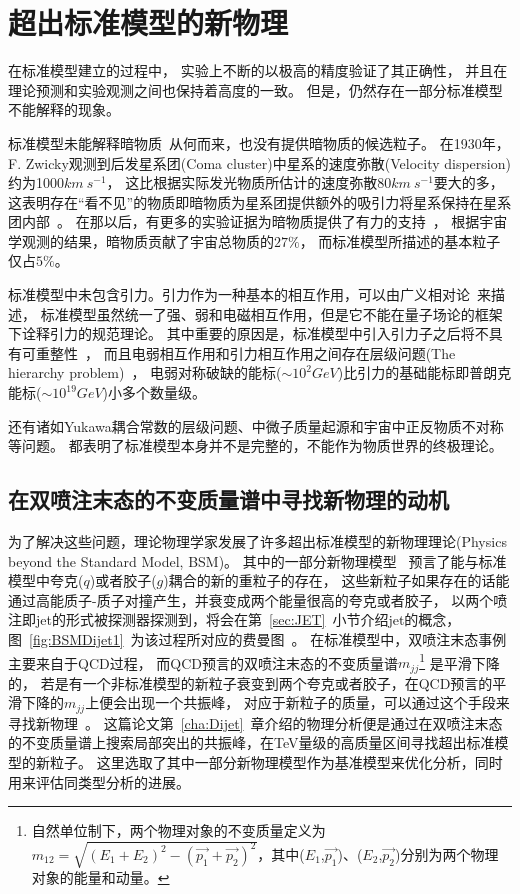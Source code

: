 \section{超出标准模型的新物理}
\label{sec:BSM}

在标准模型建立的过程中，
实验上不断的以极高的精度验证了其正确性，
并且在理论预测和实验观测之间也保持着高度的一致。
但是，仍然存在一部分标准模型不能解释的现象。

标准模型未能解释暗物质~\cite{DARKMATTER1}从何而来，也没有提供暗物质的候选粒子。
在1930年，F. Zwicky观测到后发星系团(Coma cluster)中星系的速度弥散(Velocity dispersion)约为1000$km~s^{-1}$，
这比根据实际发光物质所估计的速度弥散80$km~s^{-1}$要大的多，
这表明存在“看不见”的物质即暗物质为星系团提供额外的吸引力将星系保持在星系团内部~\cite{DARKMATTER2}。
在那以后，有更多的实验证据为暗物质提供了有力的支持~\cite{DARKMATTER1}，
根据宇宙学观测的结果，暗物质贡献了宇宙总物质的$27\%$，
而标准模型所描述的基本粒子仅占$5\%$。

标准模型中未包含引力。引力作为一种基本的相互作用，可以由广义相对论~\cite{GRE}来描述，
标准模型虽然统一了强、弱和电磁相互作用，但是它不能在量子场论的框架下诠释引力的规范理论。
其中重要的原因是，标准模型中引入引力子之后将不具有可重整性~\cite{GRE1}，
而且电弱相互作用和引力相互作用之间存在层级问题(The hierarchy problem)~\cite{HP}，
电弱对称破缺的能标($\sim 10^{2}GeV$)比引力的基础能标即普朗克能标($\sim 10^{19}GeV$)小多个数量级。

还有诸如Yukawa耦合常数的层级问题、中微子质量起源和宇宙中正反物质不对称等问题。
都表明了标准模型本身并不是完整的，不能作为物质世界的终极理论。



\subsection{在双喷注末态的不变质量谱中寻找新物理的动机}
\label{sec:BSMDijet}

为了解决这些问题，理论物理学家发展了许多超出标准模型的新物理理论(Physics beyond the Standard Model, BSM)。
其中的一部分新物理模型~\cite{qstar1,qstar2,zprime1,zprime3,wprime1,Chizhov:2009fc,Chizhov:2010jg,DM1,DM2,DM3,qbh1,qbh2,RS1,RS2,ADD}
预言了能与标准模型中夸克($q$)或者胶子($g$)耦合的新的重粒子的存在，
这些新粒子如果存在的话能通过高能质子-质子对撞产生，并衰变成两个能量很高的夸克或者胶子，
以两个喷注即jet的形式被探测器探测到，将会在第~\ref{sec:JET}~小节介绍jet的概念，
图~\ref{fig:BSMDijet1}~为该过程所对应的费曼图~\cite{FEYNR}。
在标准模型中，双喷注末态事例主要来自于QCD过程，
而QCD预言的双喷注末态的不变质量谱$m_{jj}
$\footnote{自然单位制下，两个物理对象的不变质量定义为$m_{12}=\sqrt{(E_1+E_2)^2-(\vec{p_1}+\vec{p_2})^2}$，其中($E_1$,$\vec{p_1}$)、($E_2$,$\vec{p_2}$)分别为两个物理对象的能量和动量。}
是平滑下降的，
若是有一个非标准模型的新粒子衰变到两个夸克或者胶子，在QCD预言的平滑下降的$m_{jj}$上便会出现一个共振峰，
对应于新粒子的质量，可以通过这个手段来寻找新物理~\cite{UA3}。
这篇论文第~\ref{cha:Dijet}~章介绍的物理分析便是通过在双喷注末态的不变质量谱上搜索局部突出的共振峰，在TeV量级的高质量区间寻找超出标准模型的新粒子。
这里选取了其中一部分新物理模型作为基准模型来优化分析，同时用来评估同类型分析的进展。

